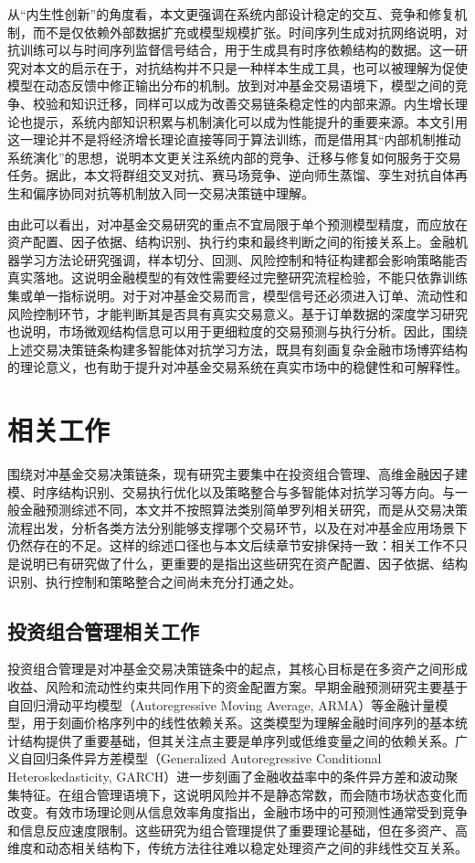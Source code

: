 从“内生性创新”的角度看，本文更强调在系统内部设计稳定的交互、竞争和修复机制，而不是仅依赖外部数据扩充或模型规模扩张。时间序列生成对抗网络说明，对抗训练可以与时间序列监督信号结合，用于生成具有时序依赖结构的数据\cite{yoon2019time}。这一研究对本文的启示在于，对抗结构并不只是一种样本生成工具，也可以被理解为促使模型在动态反馈中修正输出分布的机制。放到对冲基金交易语境下，模型之间的竞争、校验和知识迁移，同样可以成为改善交易链条稳定性的内部来源。内生增长理论也提示，系统内部知识积累与机制演化可以成为性能提升的重要来源\cite{romer1990endogenous}。本文引用这一理论并不是将经济增长理论直接等同于算法训练，而是借用其“内部机制推动系统演化”的思想，说明本文更关注系统内部的竞争、迁移与修复如何服务于交易任务。据此，本文将群组交叉对抗、赛马场竞争、逆向师生蒸馏、孪生对抗自体再生和偏序协同对抗等机制放入同一交易决策链中理解。

由此可以看出，对冲基金交易研究的重点不宜局限于单个预测模型精度，而应放在资产配置、因子依据、结构识别、执行约束和最终判断之间的衔接关系上。金融机器学习方法论研究强调，样本切分、回测、风险控制和特征构建都会影响策略能否真实落地\cite{lopezdeprado2018advances}。这说明金融模型的有效性需要经过完整研究流程检验，不能只依靠训练集或单一指标说明。对于对冲基金交易而言，模型信号还必须进入订单、流动性和风险控制环节，才能判断其是否具有真实交易意义。基于订单数据的深度学习研究也说明，市场微观结构信息可以用于更细粒度的交易预测与执行分析\cite{zhang2021market}。因此，围绕上述交易决策链条构建多智能体对抗学习方法，既具有刻画复杂金融市场博弈结构的理论意义，也有助于提升对冲基金交易系统在真实市场中的稳健性和可解释性。


\section{相关工作}
围绕对冲基金交易决策链条，现有研究主要集中在投资组合管理、高维金融因子建模、时序结构识别、交易执行优化以及策略整合与多智能体对抗学习等方向。与一般金融预测综述不同，本文并不按照算法类别简单罗列相关研究，而是从交易决策流程出发，分析各类方法分别能够支撑哪个交易环节，以及在对冲基金应用场景下仍然存在的不足。这样的综述口径也与本文后续章节安排保持一致：相关工作不只是说明已有研究做了什么，更重要的是指出这些研究在资产配置、因子依据、结构识别、执行控制和策略整合之间尚未充分打通之处。

\subsection{投资组合管理相关工作}
投资组合管理是对冲基金交易决策链条中的起点，其核心目标是在多资产之间形成收益、风险和流动性约束共同作用下的资金配置方案。早期金融预测研究主要基于自回归滑动平均模型（Autoregressive Moving Average, ARMA）等金融计量模型，用于刻画价格序列中的线性依赖关系\cite{tsay2005analysis}。这类模型为理解金融时间序列的基本统计结构提供了重要基础，但其关注点主要是单序列或低维变量之间的依赖关系。广义自回归条件异方差模型（Generalized Autoregressive Conditional Heteroskedasticity, GARCH）进一步刻画了金融收益率中的条件异方差和波动聚集特征\cite{bollerslev1986generalized}。在组合管理语境下，这说明风险并不是静态常数，而会随市场状态变化而改变。有效市场理论则从信息效率角度指出，金融市场中的可预测性通常受到竞争和信息反应速度限制\cite{fama1970efficient}。这些研究为组合管理提供了重要理论基础，但在多资产、高维度和动态相关结构下，传统方法往往难以稳定处理资产之间的非线性交互关系。

